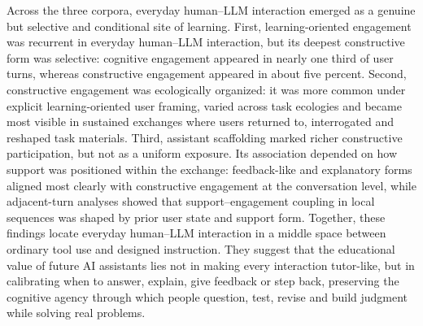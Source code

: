 Across the three corpora, everyday human--LLM interaction emerged as a genuine but selective and conditional site of learning. First, learning-oriented engagement was recurrent in everyday human--LLM interaction, but its deepest constructive form was selective: cognitive engagement appeared in nearly one third of user turns, whereas constructive engagement appeared in about five percent. Second, constructive engagement was ecologically organized: it was more common under explicit learning-oriented user framing, varied across task ecologies and became most visible in sustained exchanges where users returned to, interrogated and reshaped task materials. Third, assistant scaffolding marked richer constructive participation, but not as a uniform exposure. Its association depended on how support was positioned within the exchange: feedback-like and explanatory forms aligned most clearly with constructive engagement at the conversation level, while adjacent-turn analyses showed that support--engagement coupling in local sequences was shaped by prior user state and support form. Together, these findings locate everyday human--LLM interaction in a middle space between ordinary tool use and designed instruction.  
They suggest that the educational value of future AI assistants lies not in making every interaction tutor-like, but in calibrating when to answer, explain, give feedback or step back, preserving the cognitive agency through which people question, test, revise and build judgment while solving real problems.

